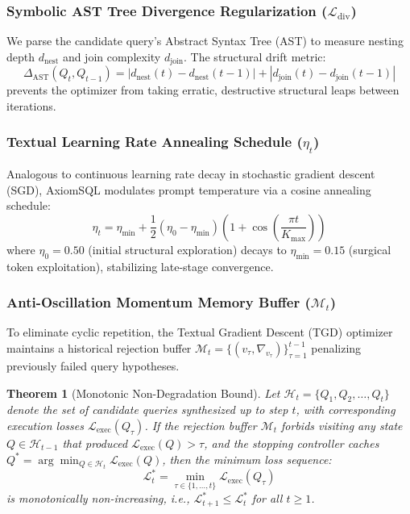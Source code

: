\documentclass[conference]{IEEEtran}
\newtheorem{theorem}{Theorem}
\begin{document}
\subsubsection{Symbolic AST Tree Divergence Regularization ($\mathcal{L}_{\text{div}}$)}
We parse the candidate query's Abstract Syntax Tree (AST) to measure nesting depth $d_{\text{nest}}$ and join complexity $d_{\text{join}}$. The structural drift metric:
\begin{equation}
    \Delta_{\text{AST}}(Q_t, Q_{t-1}) = |d_{\text{nest}}(t) - d_{\text{nest}}(t-1)| + |d_{\text{join}}(t) - d_{\text{join}}(t-1)|
\end{equation}
prevents the optimizer from taking erratic, destructive structural leaps between iterations.

\subsubsection{Textual Learning Rate Annealing Schedule ($\eta_t$)}
Analogous to continuous learning rate decay in stochastic gradient descent (SGD), AxiomSQL modulates prompt temperature via a cosine annealing schedule:
\begin{equation}
    \eta_t = \eta_{\min} + \frac{1}{2}(\eta_0 - \eta_{\min})\left(1 + \cos\left(\frac{\pi t}{K_{\max}}\right)\right)
\end{equation}
where $\eta_0 = 0.50$ (initial structural exploration) decays to $\eta_{\min} = 0.15$ (surgical token exploitation), stabilizing late-stage convergence.

\subsubsection{Anti-Oscillation Momentum Memory Buffer ($\mathcal{M}_t$)}
To eliminate cyclic repetition, the Textual Gradient Descent (TGD) optimizer maintains a historical rejection buffer $\mathcal{M}_t = \{(v_\tau, \nabla_{v_\tau})\}_{\tau=1}^{t-1}$ penalizing previously failed query hypotheses.

\begin{theorem}[Monotonic Non-Degradation Bound]
Let $\mathcal{H}_t = \{Q_1, Q_2, \dots, Q_t\}$ denote the set of candidate queries synthesized up to step $t$, with corresponding execution losses $\mathcal{L}_{\text{exec}}(Q_\tau)$. If the rejection buffer $\mathcal{M}_t$ forbids visiting any state $Q \in \mathcal{H}_{t-1}$ that produced $\mathcal{L}_{\text{exec}}(Q) > \tau$, and the stopping controller caches $Q^* = \arg\min_{Q \in \mathcal{H}_t} \mathcal{L}_{\text{exec}}(Q)$, then the minimum loss sequence:
\begin{equation}
    \mathcal{L}^*_t = \min_{\tau \in \{1, \dots, t\}} \mathcal{L}_{\text{exec}}(Q_\tau)
\end{equation}
is monotonically non-increasing, i.e., $\mathcal{L}^*_{t+1} \le \mathcal{L}^*_t$ for all $t \ge 1$.
\end{theorem}
\end{document}
